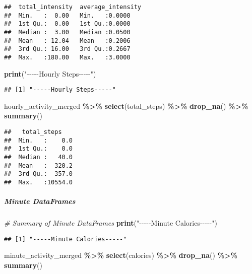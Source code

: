 \documentclass[
]{article}
\newenvironment{Shaded}{\begin{snugshade}}{\end{snugshade}}
\newcommand{\CommentTok}[1]{\textcolor[rgb]{0.56,0.35,0.01}{\textit{#1}}}
\newcommand{\FunctionTok}[1]{\textcolor[rgb]{0.13,0.29,0.53}{\textbf{#1}}}
\newcommand{\NormalTok}[1]{#1}
\newcommand{\SpecialCharTok}[1]{\textcolor[rgb]{0.81,0.36,0.00}{\textbf{#1}}}
\newcommand{\StringTok}[1]{\textcolor[rgb]{0.31,0.60,0.02}{#1}}
\begin{document}
\begin{verbatim}
##  total_intensity  average_intensity
##  Min.   :  0.00   Min.   :0.0000   
##  1st Qu.:  0.00   1st Qu.:0.0000   
##  Median :  3.00   Median :0.0500   
##  Mean   : 12.04   Mean   :0.2006   
##  3rd Qu.: 16.00   3rd Qu.:0.2667   
##  Max.   :180.00   Max.   :3.0000
\end{verbatim}

\begin{Shaded}
\begin{Highlighting}[]
\FunctionTok{print}\NormalTok{(}\StringTok{"{-}{-}{-}{-}{-}Hourly Steps{-}{-}{-}{-}{-}"}\NormalTok{)}
\end{Highlighting}
\end{Shaded}

\begin{verbatim}
## [1] "-----Hourly Steps-----"
\end{verbatim}

\begin{Shaded}
\begin{Highlighting}[]
\NormalTok{hourly\_activity\_merged }\SpecialCharTok{\%\textgreater{}\%} 
  \FunctionTok{select}\NormalTok{(total\_steps) }\SpecialCharTok{\%\textgreater{}\%} 
  \FunctionTok{drop\_na}\NormalTok{() }\SpecialCharTok{\%\textgreater{}\%} 
  \FunctionTok{summary}\NormalTok{()}
\end{Highlighting}
\end{Shaded}

\begin{verbatim}
##   total_steps     
##  Min.   :    0.0  
##  1st Qu.:    0.0  
##  Median :   40.0  
##  Mean   :  320.2  
##  3rd Qu.:  357.0  
##  Max.   :10554.0
\end{verbatim}

\hypertarget{minute-dataframes-8}{%
\subparagraph{Minute DataFrames}\label{minute-dataframes-8}}

\begin{Shaded}
\begin{Highlighting}[]
\CommentTok{\# Summary of Minute DataFrames}
\FunctionTok{print}\NormalTok{(}\StringTok{"{-}{-}{-}{-}{-}Minute Calories{-}{-}{-}{-}{-}"}\NormalTok{)}
\end{Highlighting}
\end{Shaded}

\begin{verbatim}
## [1] "-----Minute Calories-----"
\end{verbatim}

\begin{Shaded}
\begin{Highlighting}[]
\NormalTok{minute\_activity\_merged }\SpecialCharTok{\%\textgreater{}\%} 
  \FunctionTok{select}\NormalTok{(calories) }\SpecialCharTok{\%\textgreater{}\%} 
  \FunctionTok{drop\_na}\NormalTok{() }\SpecialCharTok{\%\textgreater{}\%} 
  \FunctionTok{summary}\NormalTok{()}
\end{Highlighting}
\end{Shaded}
\end{document}
